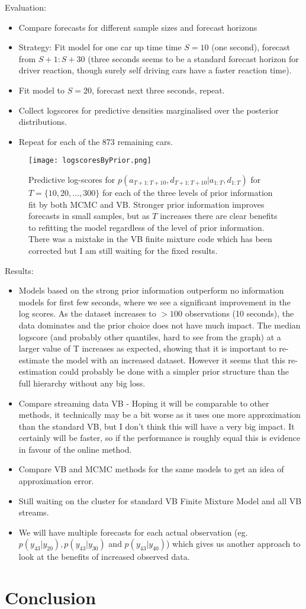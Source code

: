 \documentclass[12pt,a4paper]{article}\usepackage[]{graphicx}\usepackage[]{color}
\begin{document}
Evaluation:
\begin{itemize}
\item Compare forecasts for different sample sizes and forecast horizons
\item Strategy: Fit model for one car up time time $S = 10$ (one second), forecast from $S+1:S+30$ (three seconds seems to be a standard forecast horizon for driver reaction, though surely self driving cars have a faster reaction time).
\item Fit model to $S = 20$, forecast next three seconds, repeat.
\item Collect logscores for predictive densities marginalised over the posterior distributions.
\item Repeat for each of the 873 remaining cars.
\end{itemize}

\begin{figure}[ht]
\centering
\texttt{[image: logscoresByPrior.png]}
\caption{Predictive log-scores for $p(a_{T+1:T+10}, d_{T+1:T+10} | a_{1:T}, d_{1:T})$ for $T = \{10, 20, \dots, 300\}$ for each of the three levels of prior information fit by both MCMC and VB. Stronger prior information improves forecasts in small samples, but as $T$ increases there are clear benefits to refitting the model regardless of the level of prior information. There was a mixtake in the VB finite mixture code which has been corrected but I am still waiting for the fixed results.}
\label{fig:MainResults}
\end{figure}


Results:
\begin{itemize}
\item Models based on the strong prior information outperform no information models for first few seconds, where we see a significant improvement in the log scores. As the dataset increases to $> 100$ observations (10 seconds), the data dominates and the prior choice does not have much impact. The median logscore (and probably other quantiles, hard to see from the graph) at a larger value of T increases as expected, showing that it is important to re-estimate the model with an increased dataset. However it seems that this re-estimation could probably be done with a simpler prior structure than the full hierarchy without any big loss.
\item Compare streaming data VB - Hoping it will be comparable to other methods, it technically may be a bit worse as it uses one more approximation than the standard VB, but I don't think this will have a very big impact. It certainly will be faster, so if the performance is roughly equal this is evidence in favour of the online method. 
\item Compare VB and MCMC methods for the same models to get an idea of approximation error.
\item Still waiting on the cluster for standard VB Finite Mixture Model and all VB streams.
\item We will have multiple forecasts for each actual observation (eg. $p(y_{43} | y_{20}), p(y_{43} | y_{30})$ and $p(y_{43} | y_{40})$) which gives us another approach to look at the benefits of increased observed data.
\end{itemize}

\section{Conclusion}
\end{document}
